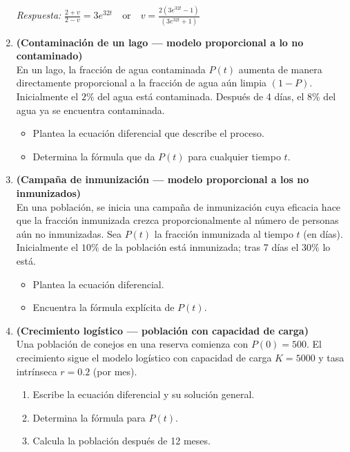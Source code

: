 \documentclass[a4paper,12pt]{article}
\begin{document}
\begin{enumerate}
\textit{Respuesta:}  
\( \frac{2 + v}{2 - v} = 3e^{32t} \quad \text{or} \quad v = \frac{2(3e^{32t} - 1)}{(3e^{32t} + 1)} \)

\item \textbf{(Contaminación de un lago — modelo proporcional a lo no contaminado)}\\
En un lago, la fracción de agua contaminada \(P(t)\) aumenta de manera directamente proporcional a la fracción de agua aún limpia \((1-P)\). Inicialmente el \(2\%\) del agua está contaminada. Después de 4 días, el \(8\%\) del agua ya se encuentra contaminada. 

\begin{itemize}
  \item Plantea la ecuación diferencial que describe el proceso.
  \item Determina la fórmula que da \(P(t)\) para cualquier tiempo \(t\).
\end{itemize}

\bigskip

\item \textbf{(Campaña de inmunización — modelo proporcional a los no inmunizados)}\\
En una población, se inicia una campaña de inmunización cuya eficacia hace que la fracción inmunizada crezca proporcionalmente al número de personas aún no inmunizadas. Sea \(P(t)\) la fracción inmunizada al tiempo \(t\) (en días). Inicialmente el \(10\%\) de la población está inmunizada; tras 7 días el \(30\%\) lo está. 

\begin{itemize}
  \item Plantea la ecuación diferencial.
  \item Encuentra la fórmula explícita de \(P(t)\).
\end{itemize}

\bigskip

\item \textbf{(Crecimiento logístico — población con capacidad de carga)}\\
Una población de conejos en una reserva comienza con \(P(0)=500\). El crecimiento sigue el modelo logístico con capacidad de carga \(K=5000\) y tasa intrínseca \(r=0.2\) (por mes). 

\begin{enumerate}
  \item Escribe la ecuación diferencial y su solución general.
  \item Determina la fórmula para \(P(t)\).
  \item Calcula la población después de 12 meses.
\end{enumerate}



\end{enumerate}
\end{document}
